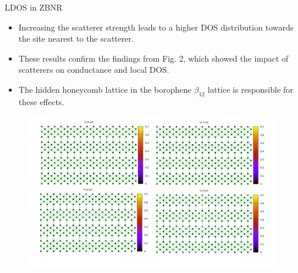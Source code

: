 \documentclass[handout,t]{beamer}
\begin{document}
\begin{frame}{LDOS in ZBNR}
	\begin{itemize}
		\item Increasing the scatterer strength leads to a higher DOS distribution towards the site nearest to the scatterer.
		\item These results confirm the findings from Fig. 2, which showed the impact of scatterers on conductance and local DOS.
		\item The hidden honeycomb lattice in the borophene $\beta_{12}$ lattice is responsible for these effects.
	\end{itemize}
	\begin{figure}[!ht]
		\centering
		\includegraphics[width=0.7\linewidth]{../figures/Slide1.PNG}
		\label{zigCSLDOS}
	  \end{figure}
\end{frame}
\end{document}
